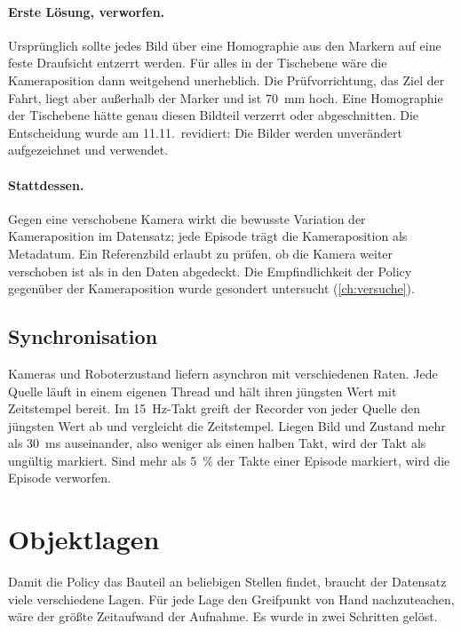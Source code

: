 \paragraph{Erste Lösung, verworfen.} Ursprünglich sollte jedes Bild über eine Homographie aus
den Markern auf eine feste Draufsicht entzerrt werden. Für alles in der Tischebene wäre die
Kameraposition dann weitgehend unerheblich. Die Prüfvorrichtung, das Ziel der Fahrt, liegt
aber außerhalb der Marker und ist \SI{70}{\milli\metre} hoch. Eine Homographie der Tischebene
hätte genau diesen Bildteil verzerrt oder abgeschnitten. Die Entscheidung wurde am 11.11.\
revidiert: Die Bilder werden unverändert aufgezeichnet und verwendet.

\paragraph{Stattdessen.} Gegen eine verschobene Kamera wirkt die bewusste Variation der
Kameraposition im Datensatz; jede Episode trägt die Kameraposition als Metadatum. Ein
Referenzbild erlaubt zu prüfen, ob die Kamera weiter verschoben ist als in den Daten
abgedeckt. Die Empfindlichkeit der Policy gegenüber der Kameraposition wurde gesondert
untersucht (\cref{ch:versuche}).

\subsection{Synchronisation}
\label{sec:sync}

Kameras und Roboterzustand liefern asynchron mit verschiedenen Raten. Jede Quelle läuft in
einem eigenen Thread und hält ihren jüngsten Wert mit Zeitstempel bereit. Im
\SI{15}{\hertz}-Takt greift der Recorder von jeder Quelle den jüngsten Wert ab und vergleicht
die Zeitstempel. Liegen Bild und Zustand mehr als \SI{30}{\milli\second} auseinander, also
weniger als einen halben Takt, wird der Takt als ungültig markiert. Sind mehr als
\SI{5}{\percent} der Takte einer Episode markiert, wird die Episode verworfen.

\section{Objektlagen}
\label{sec:lagen}

Damit die Policy das Bauteil an beliebigen Stellen findet, braucht der Datensatz viele
verschiedene Lagen. Für jede Lage den Greifpunkt von Hand nachzuteachen, wäre der größte
Zeitaufwand der Aufnahme. Es wurde in zwei Schritten gelöst.

